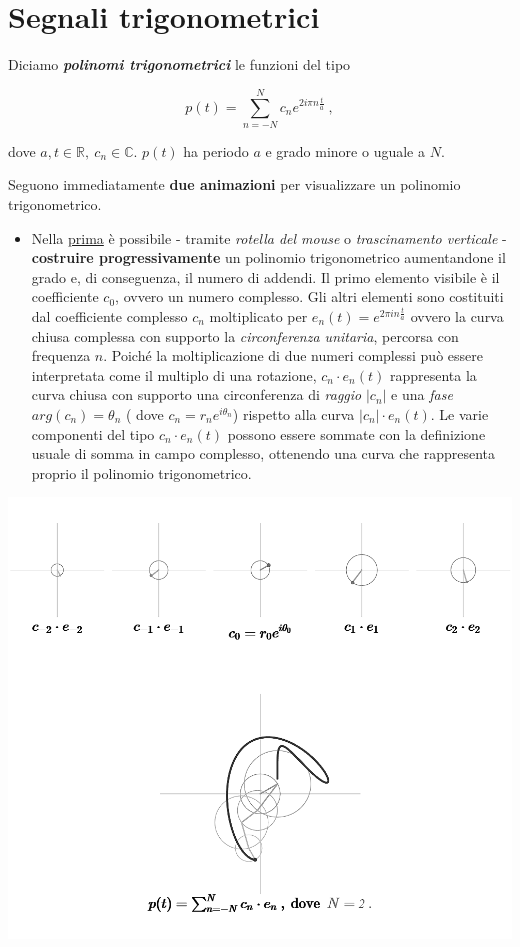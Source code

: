\documentclass[
]{book}
\providecommand{\tightlist}{%
  \setlength{\itemsep}{0pt}\setlength{\parskip}{0pt}}
\begin{document}
\hypertarget{segntrig}{%
\section{Segnali trigonometrici}\label{segntrig}}

Diciamo \emph{\textbf{polinomi trigonometrici}} le funzioni del tipo

\begin{equation}
  p(t) = \sum_{n=-N}^N c_n e^{2 i \pi n \textstyle \frac {t}{a}} \ ,
  \label{eq:poltrig}
\end{equation}

dove \(a,t \in \mathbb{R}, \ c_n \in \mathbb{C}\). \(p(t)\) ha periodo \(a\) e grado minore o uguale a \(N\).

Seguono immediatamente \textbf{due animazioni} per visualizzare un polinomio trigonometrico.

\begin{itemize}
\tightlist
\item
  Nella \href{https://bradwave.github.io/thesis/animations/s2-animation.html}{prima} è possibile - tramite \emph{rotella del mouse} o \emph{trascinamento verticale} - \textbf{costruire progressivamente} un polinomio trigonometrico aumentandone il grado e, di conseguenza, il numero di addendi.
  Il primo elemento visibile è il coefficiente \(c_0\), ovvero un numero complesso. Gli altri elementi sono costituiti dal coefficiente complesso \(c_n\) moltiplicato per \(e_n(t)=e^{2\pi in\frac{t}{a}}\) ovvero la curva chiusa complessa con supporto la \emph{circonferenza unitaria}, percorsa con frequenza \(n\). Poiché la moltiplicazione di due numeri complessi può essere interpretata come il multiplo di una rotazione, \(c_n \cdot e_n(t)\) rappresenta la curva chiusa con supporto una circonferenza di \emph{raggio} \(|c_n|\) e una \emph{fase} \(arg(c_n)=\theta_n\) ( dove \(c_n=r_{n}e^{i\theta_n}\)) rispetto alla curva \(|c_n| \cdot e_n(t)\).
  Le varie componenti del tipo \(c_n \cdot e_n(t)\) possono essere sommate con la definizione usuale di somma in campo complesso, ottenendo una curva che rappresenta proprio il polinomio trigonometrico.
\end{itemize}

\begin{center}\includegraphics[width=0.8\linewidth]{_images/pol-trig} \end{center}
\end{document}
